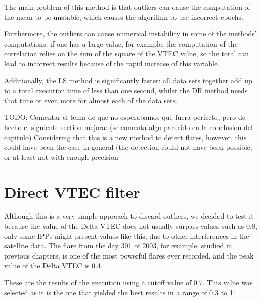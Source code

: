 The main problem of this method is that outliers can cause the computation of the mean to be unstable, which causes the algorithm to use incorrect epochs.

Furthermore, the outliers can cause numerical instability in some of the methods' computations, if one has a large value, for example, the computation of the correlation relies on the sum of the square of the VTEC value, so the total can lead to incorrect results because of the rapid increase of this variable.

Additionally, the LS method is significantly faster: all data sets together add up to a total execution time of less than one second, whilst the DR method needs that time or even more for almost each of the data sets.

TODO: Comentar el tema de que no esperabamos que fuera perfecto, pero de hecho el siguiente section mejora: (se comenta algo parecido en la conclusion del capitulo)
Considering that this is a new method to detect flares, however, this could have been the case in general (the detection could not have been possible, or at least not with enough precision

\section{Direct VTEC filter}

Although this is a very simple approach to discard outliers, we decided to test it because the value of the Delta VTEC does not usually surpass values such as 0.8, only some IPPs might present values like this, due to other interferences in the satellite data. The flare from the day 301 of 2003, for example, studied in previous chapters, is one of the most powerful flares ever recorded, and the peak value of the Delta VTEC is 0.4.

These are the results of the execution using a cutoff value of 0.7. This value was selected as it is the one that yielded the best results in a range of 0.3 to 1:

